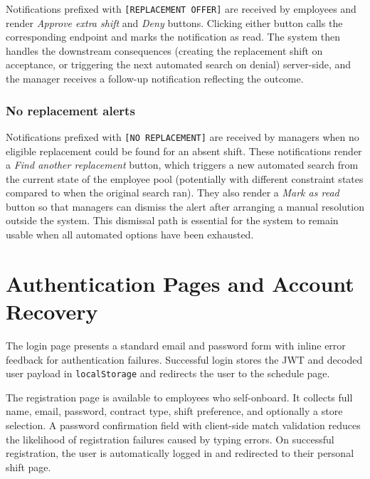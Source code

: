 \par Notifications prefixed with \texttt{[REPLACEMENT OFFER]} are received by employees and render \emph{Approve extra shift} and \emph{Deny} buttons. Clicking either button calls the corresponding endpoint and marks the notification as read. The system then handles the downstream consequences (creating the replacement shift on acceptance, or triggering the next automated search on denial) server-side, and the manager receives a follow-up notification reflecting the outcome.

\subsubsection*{No replacement alerts}

\par Notifications prefixed with \texttt{[NO REPLACEMENT]} are received by managers when no eligible replacement could be found for an absent shift. These notifications render a \emph{Find another replacement} button, which triggers a new automated search from the current state of the employee pool (potentially with different constraint states compared to when the original search ran). They also render a \emph{Mark as read} button so that managers can dismiss the alert after arranging a manual resolution outside the system. This dismissal path is essential for the system to remain usable when all automated options have been exhausted.

\section{Authentication Pages and Account Recovery}
\par The login page presents a standard email and password form with inline error feedback for authentication failures. Successful login stores the JWT and decoded user payload in \texttt{localStorage} and redirects the user to the schedule page.

\par The registration page is available to employees who self-onboard. It collects full name, email, password, contract type, shift preference, and optionally a store selection. A password confirmation field with client-side match validation reduces the likelihood of registration failures caused by typing errors. On successful registration, the user is automatically logged in and redirected to their personal shift page.

